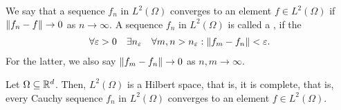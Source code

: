 \begin{definition}
  We say that a sequence $f_n$ in $L^2(\Omega)$ converges to an
  element $f\in L^2(\Omega)$ if $\left\|f_n-f\right\|\to 0$ as $n\to\infty$. A
  sequence $f_n$ in $L^2(\Omega)$ is called a , if the 
  \begin{gather}
    \label{eq:lp:cauchy}
    \forall \varepsilon>0
    \quad \exists n_\varepsilon
    \quad\forall m,n>n_\varepsilon :
    \left\|f_m-f_n\right\| < \varepsilon.
  \end{gather}
  For the latter, we also say $\left\|f_m-f_n\right\|\to 0$ as
  $n,m\to\infty$. 
\end{definition}

\begin{theorem}
  Let $\Omega\subseteq \mathbb R^d$. Then,
  $L^2(\Omega)$ is a Hilbert space, that is, it is complete, that is,
  every Cauchy sequence $f_n$ in $L^2(\Omega)$ converges to an
  element $f\in L^2(\Omega)$.
\end{theorem}

